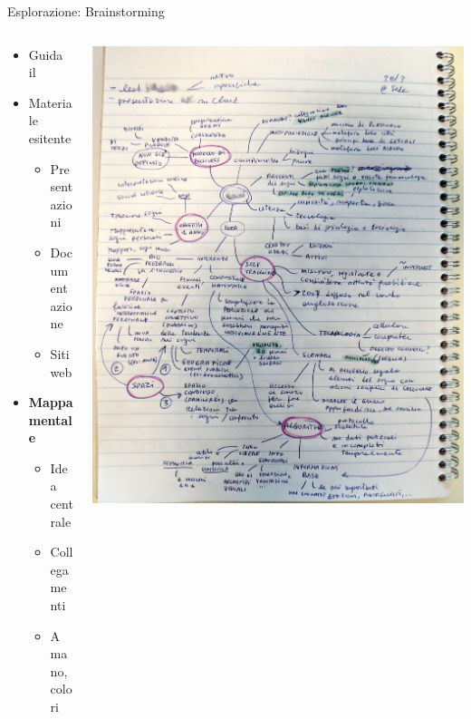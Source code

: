 	\begin{frame}{Esplorazione: Brainstorming}
		\begin{columns}[T]
		    \begin{column}{.5\textwidth}
				\begin{itemize}
					\item Guida il 
					\item Materiale esitente
					\begin{itemize}
						\item Presentazioni
						\item Documentazione
						\item Siti web
					\end{itemize}
				\end{itemize}	

				\begin{itemize}
					\item \textbf{Mappa mentale}
					\begin{itemize}
						\item Idea centrale
						\item Collegamenti
						\item A mano, colori
					\end{itemize}
				\end{itemize}
		    \end{column}
		    \begin{column}{.5\textwidth}
				\hspace*{-0.4cm} \includegraphics[scale=0.17]{images/mindmap-1}
		    \end{column}
		 \end{columns}
		

\end{frame}
